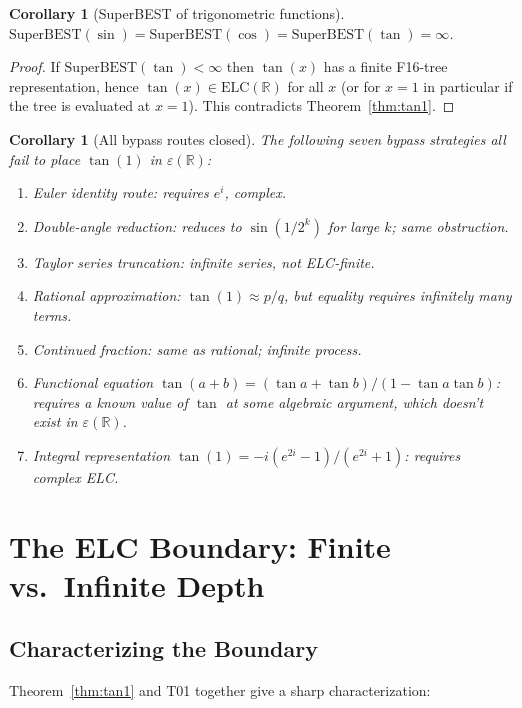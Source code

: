 \documentclass[11pt]{article}
\newtheorem{corollary}[theorem]{Corollary}
\begin{document}
\begin{corollary}[SuperBEST of trigonometric functions]
$\mathrm{SuperBEST}(\sin)=\mathrm{SuperBEST}(\cos)=\mathrm{SuperBEST}(\tan)=\infty$.
\end{corollary}

\begin{proof}
If $\mathrm{SuperBEST}(\tan)<\infty$ then $\tan(x)$ has a finite F16-tree representation,
hence $\tan(x)\in\mathrm{ELC}(\mathbb{R})$ for all $x$ (or for $x=1$ in particular
if the tree is evaluated at $x=1$). This contradicts Theorem~\ref{thm:tan1}.
\end{proof}

\begin{corollary}[All bypass routes closed]
The following seven bypass strategies all fail to place $\tan(1)$ in $\varepsilon(\mathbb{R})$:
\begin{enumerate}
  \item Euler identity route: requires $e^i$, complex.
  \item Double-angle reduction: reduces to $\sin(1/2^k)$ for large $k$; same obstruction.
  \item Taylor series truncation: infinite series, not ELC-finite.
  \item Rational approximation: $\tan(1)\approx p/q$, but equality requires infinitely many terms.
  \item Continued fraction: same as rational; infinite process.
  \item Functional equation $\tan(a+b)=(\tan a+\tan b)/(1-\tan a\tan b)$: requires a known value of $\tan$ at some algebraic argument, which doesn't exist in $\varepsilon(\mathbb{R})$.
  \item Integral representation $\tan(1)=-i(e^{2i}-1)/(e^{2i}+1)$: requires complex ELC.
\end{enumerate}
\end{corollary}

\section{The ELC Boundary: Finite vs.\ Infinite Depth}

\subsection{Characterizing the Boundary}

Theorem~\ref{thm:tan1} and T01 together give a sharp characterization:
\end{document}
